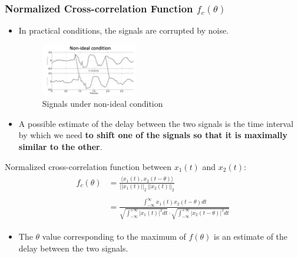  
\subsubsection{Normalized Cross-correlation Function $f_{c}(\theta)$}
\begin{itemize}
 \item In practical conditions, the signals are corrupted by noise. 
  \begin{figure}[H]\centering \includegraphics[width=0.4\textwidth]{images/nonideal}
   \caption{Signals under non-ideal condition} \end{figure}
 \item A possible estimate of the delay between the two signals is the time interval by which we need \textbf{to shift one of the signals
   so that it is maximally similar to the other}.
\end{itemize}

 Normalized cross-correlation function between $x_{1}(t)$ and $x_{2}(t)$:
 \begin{align*}\begin{split}
 f_{c}(\theta) &= \frac{\langle x_{1}(t), x_{2}(t-\theta) \rangle}{ \lvert \lvert x_{1}(t) \rvert \rvert_{2} \ \lvert \lvert x_{2}(t) \rvert \rvert_{2}} \\\\
 &= \frac{\int_{-\infty}^{\infty}  x_{1}(t) x_{2}(t-\theta) dt}{\sqrt{\int_{-\infty}^{+\infty}\lvert x_{1}(t)
 \rvert^{2} dt} \cdot \sqrt{\int_{-\infty}^{+\infty}\lvert x_{2}(t-\theta) \rvert^{2} dt}}
 \end{split} \end{align*}
\begin{itemize}
    \item The $\theta$ value corresponding to the maximum of $f(\theta)$ is an estimate of the delay between the two signals.
 \end{itemize}
 
